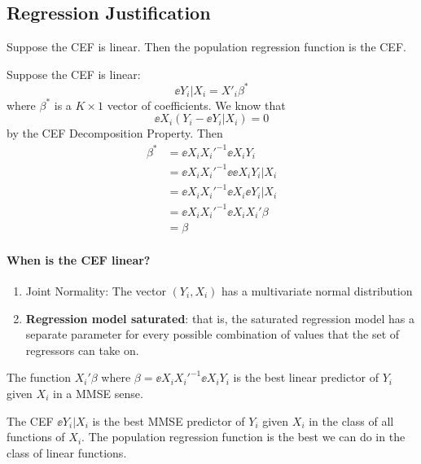 \documentclass[11pt]{article}
\begin{document}
\subsection{Regression Justification}

\begin{theorem}
	Suppose the CEF is linear. Then the population regression function is the CEF.
\end{theorem}
\begin{theorem}[]
	Suppose the CEF is linear:
	\begin{equation}
		\ee{Y_i|X_i} = X'_i \beta^*
	\end{equation}
	where $\beta^*$ is a $K \times 1$ vector of coefficients. We know that 
	\begin{equation}
		\ee{X_i (Y_i - \ee{Y_i|X_i})} = 0
	\end{equation}
	by the CEF Decomposition Property. Then
	\begin{align*}
	 \beta^* &= \ee{X_i X_i'}^{-1} \ee{X_i Y_i} \tag{Linear Regression} \\
	 &= \ee{X_i X_i'}^{-1} \ee{\ee{X_i Y_i|X_i}} \tag{LIE} \\
	 &= \ee{X_i X_i'}^{-1} \ee{X_i \ee{Y_i|X_i}} \\
	 &= \ee{X_i X_i'}^{-1} \ee{X_i X_i' \beta} \tag{CEF Linear} \\
	 &= \beta
	\end{align*}
\end{theorem}

\paragraph*{When is the CEF linear?}
\begin{enumerate}
	\item Joint Normality: The vector $(Y_i,X_i)$ has a multivariate normal distribution
	\item \textbf{Regression model saturated}: that is, the saturated regression model has a separate parameter for every possible combination of values that the set of regressors can take on.
\end{enumerate}

\begin{theorem}
	The function $X_i' \beta$ where $\beta = \ee{X_i X_i'}^{-1} \ee{X_i Y_i}$ is the best linear predictor of $Y_i$ given $X_i$ in a MMSE sense.
\end{theorem}

\begin{interpretation}
	The CEF $\ee{Y_i|X_i}$ is the best MMSE predictor of $Y_i$ given $X_i$ in the class of all functions of $X_i$. The population regression function is the best we can do in the class of linear functions.
\end{interpretation}
\end{document}
